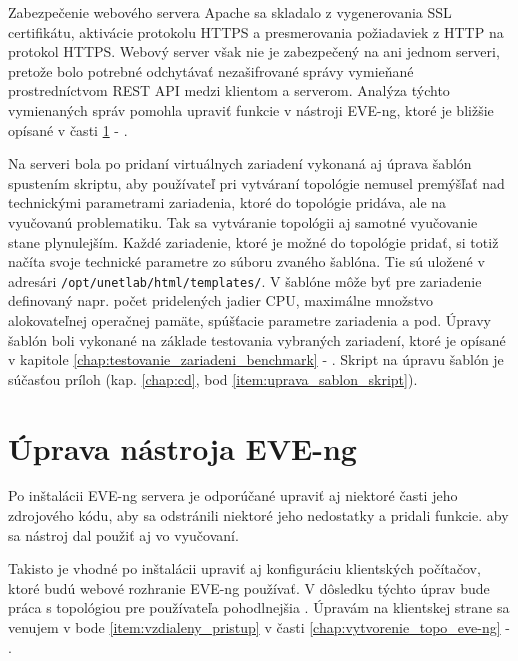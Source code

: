 Zabezpečenie webového servera Apache sa skladalo z vygenerovania SSL certifikátu, aktivácie protokolu HTTPS a presmerovania požiadaviek z HTTP na protokol HTTPS. Webový server však nie je zabezpečený na ani jednom serveri, pretože bolo potrebné odchytávať nezašifrované správy vymieňané prostredníctvom REST API medzi klientom a serverom. Analýza týchto vymienaných správ pomohla upraviť funkcie v nástroji EVE-ng, ktoré je bližšie opísané v časti \ref{chap:eve_ng_uprava_zdroj_kodov} - .

Na serveri bola po pridaní virtuálnych zariadení vykonaná aj úprava šablón spustením skriptu, aby používateľ pri vytváraní topológie nemusel premýšľať nad technickými parametrami zariadenia, ktoré do topológie pridáva, ale na vyučovanú problematiku. Tak sa vytváranie topológii aj samotné vyučovanie stane plynulejším. Každé zariadenie, ktoré je možné do topológie pridať, si totiž načíta svoje technické parametre zo súboru zvaného šablóna. Tie sú uložené v adresári \texttt{/opt/unetlab/html/templates/}. V šablóne môže byť pre zariadenie definovaný napr. počet pridelených jadier CPU, maximálne množstvo alokovateľnej operačnej pamäte, spúšťacie parametre zariadenia a pod. Úpravy šablón boli vykonané na základe testovania vybraných zariadení, ktoré je opísané v kapitole \ref{chap:testovanie_zariadeni_benchmark} - . Skript na úpravu šablón je súčasťou príloh (kap. \ref{chap:cd}, bod \ref{item:uprava_sablon_skript}).






\section{Úprava nástroja EVE-ng}
\label{chap:eve_ng_uprava_zdroj_kodov}

Po inštalácii EVE-ng servera je odporúčané upraviť aj niektoré časti jeho zdrojového kódu, aby sa odstránili niektoré jeho nedostatky a pridali funkcie. aby sa nástroj dal použiť aj vo vyučovaní.

Takisto je vhodné po inštalácii upraviť aj konfiguráciu klientských počítačov, ktoré budú webové rozhranie EVE-ng používať. V dôsledku týchto úprav bude práca s topológiou pre používateľa pohodlnejšia . Úpravám na klientskej strane sa venujem v bode \ref{item:vzdialeny_pristup} v časti \ref{chap:vytvorenie_topo_eve-ng} - .





